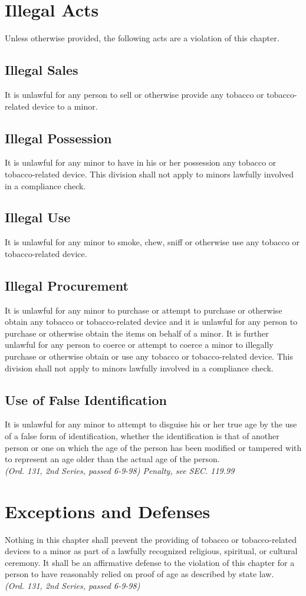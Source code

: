 \section{Illegal Acts}
Unless otherwise provided, the following acts are a violation of this chapter.
\subsection{Illegal Sales}
It is unlawful for any person to sell or otherwise provide any tobacco or tobacco-related device to a minor.
\subsection{Illegal Possession}
It is unlawful for any minor to have in his or her possession any tobacco or tobacco-related device. This division shall not apply to minors lawfully involved in a compliance check.
\subsection{Illegal Use}
It is unlawful for any minor to smoke, chew, sniff or otherwise use any tobacco or tobacco-related device.
\subsection{Illegal Procurement}
It is unlawful for any minor to purchase or attempt to purchase or otherwise obtain any tobacco or tobacco-related device and it is unlawful for any person to purchase or otherwise obtain the items on behalf of a minor.  It is further unlawful for any person to coerce or attempt to coerce a minor to illegally purchase or otherwise obtain or use any tobacco or tobacco-related device.  This division shall not apply to minors lawfully involved in a compliance check.
\subsection{Use of False Identification}
It is unlawful for any minor to attempt to disguise his or her true age by the use of a false form of identification, whether the identification is that of another person or one on which the age of the person has been modified or tampered with to represent an age older than the actual age of the person.\\
\emph{(Ord. 131, 2nd Series, passed 6-9-98)  Penalty, see SEC. 119.99}
\section{Exceptions and Defenses}
Nothing in this chapter shall prevent the providing of tobacco or tobacco-related devices to a minor as part of a lawfully recognized religious, spiritual, or cultural ceremony.  It shall be an affirmative defense to the violation of this chapter for a person to have reasonably relied on proof of age as described by state law.\\
\emph{(Ord. 131, 2nd Series, passed 6-9-98)}

